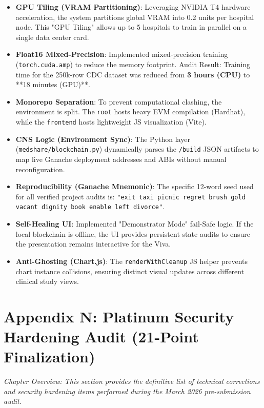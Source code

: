 \documentclass[10pt, a4paper, twocolumn]{article}
\begin{document}
\begin{itemize}[leftmargin=1.5em]
    \item \textbf{GPU Tiling (VRAM Partitioning)}: Leveraging NVIDIA T4 hardware acceleration, the system partitions global VRAM into 0.2 units per hospital node. This "GPU Tiling" allows up to 5 hospitals to train in parallel on a single data center card.
    \item \textbf{Float16 Mixed-Precision}: Implemented mixed-precision training (\texttt{torch.cuda.amp}) to reduce the memory footprint. Audit Result: Training time for the 250k-row CDC dataset was reduced from \textbf{3 hours (CPU)} to **18 minutes (GPU)**.
    \item \textbf{Monorepo Separation}: To prevent computational clashing, the environment is split. The \texttt{root} hosts heavy EVM compilation (Hardhat), while the \texttt{frontend} hosts lightweight JS visualization (Vite).
    \item \textbf{CNS Logic (Environment Sync)}: The Python layer (\texttt{medshare/blockchain.py}) dynamically parses the \texttt{/build} JSON artifacts to map live Ganache deployment addresses and ABIs without manual reconfiguration.
    \item \textbf{Reproducibility (Ganache Mnemonic)}: The specific 12-word seed used for all verified project audits is: \texttt{"exit taxi picnic regret brush gold vacant dignity book enable left divorce"}.
    \item \textbf{Self-Healing UI}: Implemented "Demonstrator Mode" fail-Safe logic. If the local blockchain is offline, the UI provides persistent state audits to ensure the presentation remains interactive for the Viva.
    \item \textbf{Anti-Ghosting (Chart.js)}: The \texttt{renderWithCleanup} JS helper prevents chart instance collisions, ensuring distinct visual updates across different clinical study views.
\end{itemize}

\section*{Appendix N: Platinum Security Hardening Audit (21-Point Finalization)}
\textit{Chapter Overview: This section provides the definitive list of technical corrections and security hardening items performed during the March 2026 pre-submission audit.}
\end{document}
